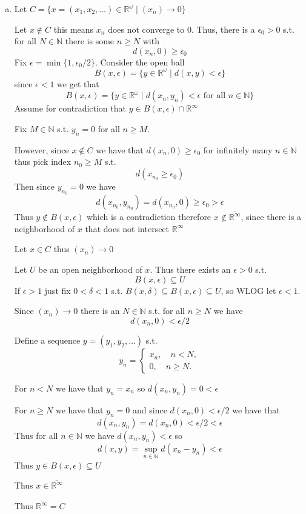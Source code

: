 \documentclass[12pt, letterpaper]{article}
\newcommand{\R}{\mathbb{R}}
\newcommand{\N}{\mathbb{N}}
\renewcommand{\t}[1]{\text{#1}}
\begin{document}
\begin{enumerate}[(a)]
    Thus, $\overline{\R^\infty}=\R^\infty$, since any point outside we can create a neighborhood that does not intersect $\R^\infty$

    \item Let $C=\{x=(x_1,x_2,\dots) \in \R^\omega \mid (x_n)\to 0\}$
    
    Let $x \notin C$ this means $x_n$ does not converge to 0. Thus, there is a $\epsilon_0>0$ s.t. for all $N \in \N$ there is some $n \geq N$ with
    \[d(x_n,0)\geq \epsilon_0\]
    Fix $\epsilon=\min\{1,\epsilon_0/2\}$. Consider the open ball
    \[B(x,\epsilon)=\{y \in \R^\omega \mid d(x,y) < \epsilon\}\]
    since $\epsilon < 1$ we get that 
    \[B(x,\epsilon)=\{y \in \R^\omega \mid d(x_n,y_n) < \epsilon \t{ for all } n \in \N\}\]
    Assume for contradiction that $y  \in B(x,\epsilon) \cap \R^\infty$

    Fix $M \in \N$ s.t. $y_n=0$ for all $n \geq M$.

    However, since $x \notin C$ we have that $d(x_n,0)\geq \epsilon_0$ for infinitely many $n \in \N$ thus pick index $n_0 \geq M$ s.t.
    \[d(x_{n_0} \geq \epsilon_0)\]
    Then since $y_{n_0}=0$ we have
    \[d(x_{n_0},y_{n_0})=d(x_{n_0},0) \geq \epsilon_0 > \epsilon\]
    Thus $y \notin B(x,\epsilon)$ which is a contradiction therefore $x \notin \overline{\R^\infty}$, since there is a neighborhood of $x$ that does not intersect $\R^\infty$

    Let $x \in C$ thus $(x_n) \to 0$

    Let $U$ be an open neighborhood of $x$. Thus there exists an $\epsilon > 0$ s.t. 
    \[B(x,\epsilon) \subseteq U\]
    If $\epsilon >1$ just fix $0 < \delta < 1$ s.t. $B(x,\delta) \subseteq B(x,\epsilon) \subseteq U$, so WLOG let $\epsilon <1$.

    Since $(x_n) \to 0$ there is an $N \in \N$ s.t. for all $n \geq N$ we have
    \[d(x_n,0) < \epsilon/2\]

    Define a sequence $y=(y_1,y_2,\dots)$ s.t.
    \begin{equation*}
        y_n=\begin{cases}
            x_n, \quad n < N,\\
            0, \quad n \geq N.
        \end{cases}
    \end{equation*}

    For $n < N$ we have that $y_n=x_n$ so $d(x_n,y_n)=0 < \epsilon$

    For $n \geq N$ we have that $y_n=0$ and since $d(x_n,0) < \epsilon/2$ we have that
    \[d(x_n,y_n)=d(x_n,0)<\epsilon/2<\epsilon\]
    Thus for all $n \in \N$ we have $d(x_n,y_n) < \epsilon$ so
    \[d(x,y)=\sup_{n \in \N}d(x_n-y_n)< \epsilon\]
    Thus $y \in B(x,\epsilon) \subseteq U$

    Thus $x \in \overline{\R^\infty}$ 

    Thus $\overline{\R^\infty}=C$
\end{enumerate}
\end{document}
